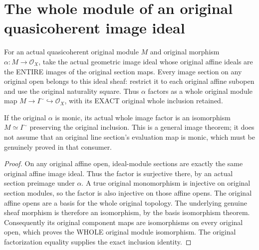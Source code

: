 \section{The whole module of an original quasicoherent image ideal}

\begin{definition}
\label{def:fc-quasicoherent-image-module-factor}
\leanok
{}
For an actual quasicoherent original module $M$ and original morphism
$\alpha:M\to\mathcal O_X$, take the actual geometric image ideal whose
original affine ideals are the ENTIRE images of the original section
maps. Every image section on any original open belongs to this ideal
sheaf: restrict it to each original affine subopen and use the original
naturality square. Thus $\alpha$ factors as a whole original module map
$M\to I^{\sim}\hookrightarrow\mathcal O_X$, with its EXACT original
whole inclusion retained.
\end{definition}

\begin{theorem}
\label{thm:fc-quasicoherent-image-module-iso}
\leanok
{}
If the original $\alpha$ is monic, its actual whole image factor is an
isomorphism $M\simeq I^{\sim}$ preserving the original inclusion. This
is a general image theorem; it does not assume that an original line
section's evaluation map is monic, which must be genuinely proved in
that consumer.
\end{theorem}
\begin{proof}
On any original affine open, ideal-module sections are exactly the same
original affine image ideal. Thus the factor is surjective there, by an
actual section preimage under $\alpha$. A true original monomorphism
is injective on original section modules, so the factor is also injective
on those affine opens. The original affine opens are a basis for the
whole original topology. The underlying genuine sheaf morphism is
therefore an isomorphism, by the basis isomorphism theorem. Consequently
its original component maps are isomorphisms on every original open,
which proves the WHOLE original module isomorphism. The original
factorization equality supplies the exact inclusion identity.
\end{proof}
